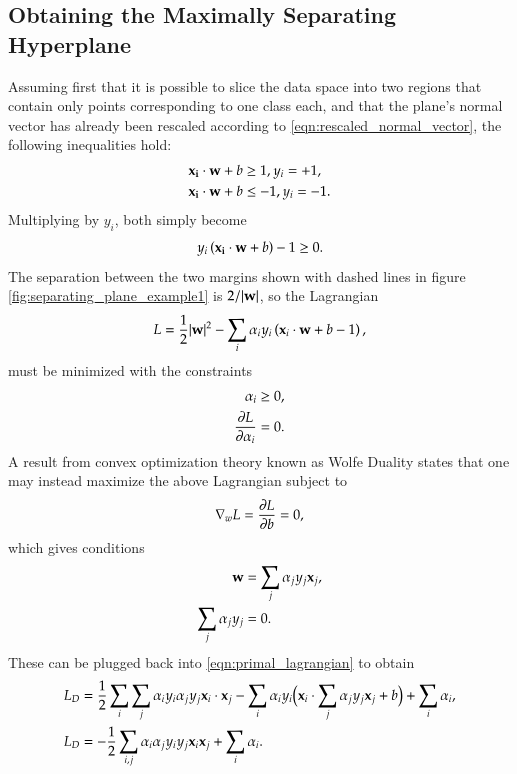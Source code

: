 \subsection{Obtaining the Maximally Separating Hyperplane}
Assuming first that it is possible to slice the data space into two regions that contain only points corresponding to one class each, and that the plane's normal vector has already been rescaled according to \eqref{eqn:rescaled_normal_vector}, the following inequalities hold:
\begin{equation}
	\begin{aligned}
		\mathbf{x_i}\cdot \mathbf{w} + b &\ge 1, y_i = +1, \\
		\mathbf{x_i}\cdot \mathbf{w} + b &\le -1, y_i = -1.
	\end{aligned} \label{eqn:dedersenslagrangebetingelserder}
\end{equation}
Multiplying by $y_i$, both simply become
\begin{equation}
	y_i\left( \mathbf{x_i}\cdot \mathbf{w} + b \right) - 1 \ge 0.
\end{equation}
The separation between the two margins shown with dashed lines in figure \ref{fig:separating_plane_example1} is $2/|\mathbf{w}|$, 
so the Lagrangian
\begin{equation}
	L = \frac{1}{2} |\mathbf{w}|^2 - \sum_i \alpha_i y_i \left( \mathbf{x}_i\cdot \mathbf{w} + b - 1 \right), \label{eqn:primal_lagrangian}
\end{equation}
must be minimized with the constraints
\begin{align}
	\alpha_i &\ge 0, \\
	\pardiff{L}{\alpha_i} &= 0.
\end{align}
A result from convex optimization theory known as Wolfe Duality\cite{wolfe1961duality} states that one may instead maximize the above Lagrangian subject to
\begin{equation}
	\nabla_w L = \pardiff{L}{b} = 0,
\end{equation}
which gives conditions
\begin{align}
	\mathbf{w} &= \sum_j \alpha_jy_j\mathbf{x}_j, \\
	\sum_j \alpha_jy_j &= 0.
\end{align}
These can be plugged back into \eqref{eqn:primal_lagrangian} to obtain
\begin{align}
	L_D &= \frac{1}{2} \sum_i \sum_j \alpha_i y_i \alpha_j y_j \mathbf{x}_i \cdot \mathbf{x}_j
	- \sum_i \alpha_i y_i \big( \mathbf{x}_i \cdot \sum_j \alpha_j y_j \mathbf{x}_j + b \big) + \sum_i \alpha_i, \\
	L_D &= -\frac{1}{2} \sum_{i,j} \alpha_i \alpha_j y_i y_j \mathbf{x}_i \mathbf{x}_j + \sum_i \alpha_i. \label{eqn:dual_lagrangian}
\end{align}
